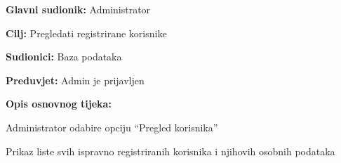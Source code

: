 					\noindent {}
					\begin{packed_item}
	
						\item \textbf{Glavni sudionik: }  Administrator
						\item  \textbf{Cilj:} Pregledati registrirane korisnike
						\item  \textbf{Sudionici:} Baza podataka
						\item  \textbf{Preduvjet:} Admin je prijavljen
						\item  \textbf{Opis osnovnog tijeka:} 
						
						
						\item[] \begin{packed_enum}
	
							\item Administrator odabire opciju “Pregled korisnika”	 						
							\item Prikaz liste svih ispravno registriranih korisnika i njihovih osobnih podataka
							
						\end{packed_enum}
					\end{packed_item}
					\noindent {}
